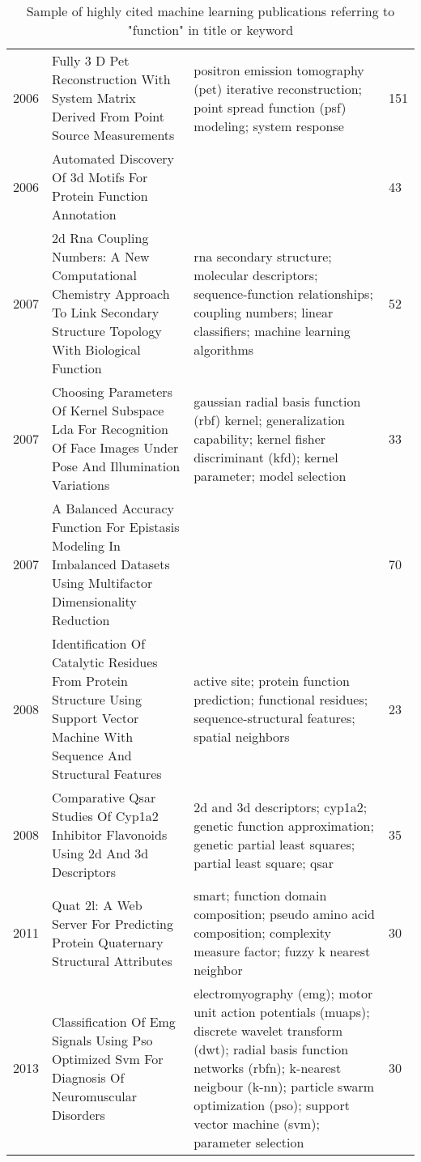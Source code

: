 \begin{table}[ht]
\begin{tabular}{p{}p{}p{}p{}}
  2006 & Fully 3 D Pet Reconstruction With System Matrix Derived From Point Source Measurements & positron emission tomography (pet) iterative reconstruction; point spread function (psf) modeling; system response & 151 \\ 
  2006 & Automated Discovery Of 3d Motifs For Protein Function Annotation &  &  43 \\ 
  2007 & 2d Rna Coupling Numbers: A New Computational Chemistry Approach To Link Secondary Structure Topology With Biological Function & rna secondary structure; molecular descriptors; sequence-function relationships; coupling numbers; linear classifiers; machine learning algorithms &  52 \\ 
  2007 & Choosing Parameters Of Kernel Subspace Lda For Recognition Of Face Images Under Pose And Illumination Variations & gaussian radial basis function (rbf) kernel; generalization capability; kernel fisher discriminant (kfd); kernel parameter; model selection &  33 \\ 
  2007 & A Balanced Accuracy Function For Epistasis Modeling In Imbalanced Datasets Using Multifactor Dimensionality Reduction &  &  70 \\ 
  2008 & Identification Of Catalytic Residues From Protein Structure Using Support Vector Machine With Sequence And Structural Features & active site; protein function prediction; functional residues; sequence-structural features; spatial neighbors &  23 \\ 
  2008 & Comparative Qsar Studies Of Cyp1a2 Inhibitor Flavonoids Using 2d And 3d Descriptors & 2d and 3d descriptors; cyp1a2; genetic function approximation; genetic partial least squares; partial least square; qsar &  35 \\ 
  2011 & Quat 2l: A Web Server For Predicting Protein Quaternary Structural Attributes & smart; function domain composition; pseudo amino acid composition; complexity measure factor; fuzzy k nearest neighbor &  30 \\ 
  2013 & Classification Of Emg Signals Using Pso Optimized Svm For Diagnosis Of Neuromuscular Disorders & electromyography (emg); motor unit action potentials (muaps); discrete wavelet transform (dwt); radial basis function networks (rbfn); k-nearest neigbour (k-nn); particle swarm optimization (pso); support vector machine (svm); parameter selection &  30 \\ 
   \hline
\end{tabular}
\endgroup
\caption{Sample of highly cited machine learning publications referring to "function" in title or keyword} 
\label{tab:function_in_ml}
\end{table}
